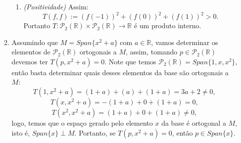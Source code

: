 \documentclass{article}
\begin{document}
\begin{enumerate}
\begin{enumerate}
\begin{enumerate}
						\item \textit{(Positividade)} Assim:
						$$
						T(f,f) := (f(-1))^{2} + (f(0))^{2}+ (f(1))^{2}>0.
						$$
						Portanto $T: \mathcal{P}_{2}(\mathbb{R}) \times \mathcal{P}_{2}(\mathbb{R}) \to \mathbb{R}$ é um produto interno.
					\end{enumerate}
					
					\item Assumindo que $M = Span\{x^{2}+a\}$ com $a \in \mathbb{R}$, vamos determinar os elementos de $\mathcal{P}_{2}(\mathbb{R})$ ortogonais a $M$, assim, tomando $p \in \mathcal{P}_{2}(\mathbb{R})$ devemos ter $T(p, x^{2}+a)=0$. Note que temos $\mathcal{P}_{2}(\mathbb{R}) = Span\{1, x, x^{2}\}$, então basta determinar quais desses elementos da base são ortogonais a $M$:
					$$
					T(1, x^{2}+a) = (1+a)+(a)+(1+a)= 3a+2 \neq 0,
					$$
					$$
					T(x, x^{2}+a) = -(1+a)+0+(1+a)=0,
					$$
					$$
					T(x^{2}, x^{2}+a) = (1+a)+0+(1+a) \neq 0,
					$$
					logo, temos que o espaço gerado pelo elemento $x$ da base é ortogonal a $M$, isto é, $Span\{x\}\perp M$. Portanto, se $T(p, x^{2}+a) = 0$, então $p \in Span\{x\}$.
				
					
			\end{enumerate}
		
		
	\end{enumerate}
		
\end{document}
